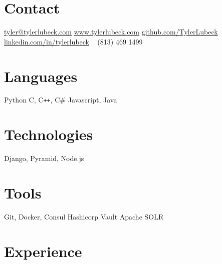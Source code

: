 \documentclass[print]{friggeri-cv} %
\begin{document}


\begin{aside} %
\section{Contact}
\href{mailto:tyler@tylerlubeck.com}{tyler@tylerlubeck.com}
\href{https://www.tylerlubeck.com}{www.tylerlubeck.com}
\href{https://www.github.com/TylerLubeck}{github.com/TylerLubeck}
\href{https://www.linkedin.com/in/tylerlubeck}{linkedin.com/in/tylerlubeck}
~
(813) 469 1499
\section{Languages}
Python
C, C{}\texttt{++}, C\#
Javascript, Java
\section{Technologies}
Django, Pyramid, Node.js
\section{Tools}
Git, Docker, Consul
Hashicorp Vault
Apache SOLR
\end{aside}


\section{Experience}
\end{document}
